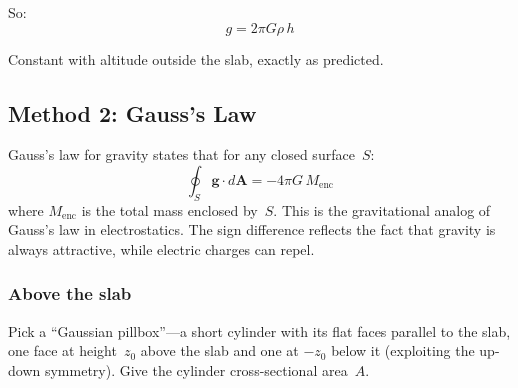 \documentclass[11pt, letterpaper]{article}
\begin{document}
So:
\begin{equation}
  \boxed{\;g = 2\pi G \rho\, h\;}
  \label{eq:slab}
\end{equation}

Constant with altitude outside the slab, exactly as predicted.

\subsection{Method 2: Gauss's Law}

Gauss's law for gravity states that for any closed surface~$S$:
\begin{equation}
  \oint_S \mathbf{g} \cdot d\mathbf{A} = -4\pi G\, M_{\text{enc}}
\end{equation}
where $M_{\text{enc}}$ is the total mass enclosed by~$S$. This is the gravitational analog of Gauss's law in electrostatics. The sign difference reflects the fact that gravity is always attractive, while electric charges can repel.

\subsubsection{Above the slab}

Pick a ``Gaussian pillbox''---a short cylinder with its flat faces parallel to the slab, one face at height~$z_0$ above the slab and one at $-z_0$ below it (exploiting the up-down symmetry). Give the cylinder cross-sectional area~$A$.

\end{document}
